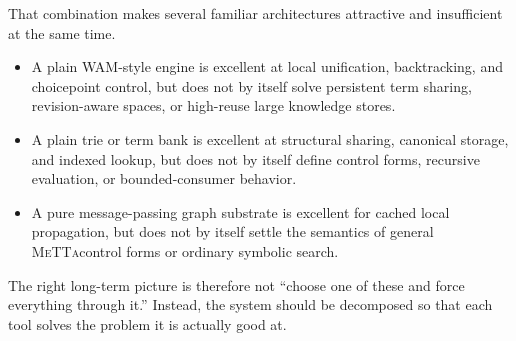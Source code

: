 \documentclass[11pt]{article}
\newcommand{\MeTTa}{\textsc{MeTTa}}
\newcommand{\WAM}{\textsc{WAM}}
\begin{document}
That combination makes several familiar architectures attractive and insufficient at the same time.
\begin{itemize}
    \item A plain \WAM-style engine is excellent at local unification, backtracking, and choicepoint control, but does not by itself solve persistent term sharing, revision-aware spaces, or high-reuse large knowledge stores.
    \item A plain trie or term bank is excellent at structural sharing, canonical storage, and indexed lookup, but does not by itself define control forms, recursive evaluation, or bounded-consumer behavior.
    \item A pure message-passing graph substrate is excellent for cached local propagation, but does not by itself settle the semantics of general \MeTTa control forms or ordinary symbolic search.
\end{itemize}

The right long-term picture is therefore not ``choose one of these and force everything through it.'' Instead, the system should be decomposed so that each tool solves the problem it is actually good at.
\end{document}
